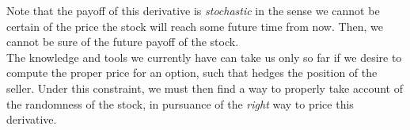 \documentclass[../TGMAFFIRO]{subfiles}
\begin{document}
Note that the payoff of this derivative is \textit{stochastic} in the sense we cannot be certain of the price the stock will reach some future time from now. Then, we cannot be sure of the future payoff of the stock.\\

The knowledge and tools we currently have can take us only so far if we desire to compute the proper price for an option, such that hedges the position of the seller. Under this constraint, we must then find a way to properly take account of the randomness of the stock, in pursuance of the \textit{right} way to price this derivative.
\end{document}
